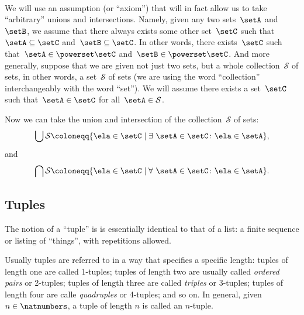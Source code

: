 



\


We will use an assumption (or ``axiom'') that will in fact allow us to take ``arbitrary'' unions and intersections.
Namely, given any two sets~$\setA$ and~$\setB$, we assume that there always exists some other set~$\setC$ such that~$\setA \subseteq \setC$ and~$\setB \subseteq \setC$.
In other words, there exists~$\setC$ such that~$\setA \in \powerset \setC$ and~$\setB \in \powerset \setC$.
And more generally, suppose that we are given not just two sets, but a whole collection~$\mathcal{S}$ of sets, in other words, a set~$\mathcal{S}$ of sets (we are using the word ``collection'' interchangeably with the word ``set'').
We will assume there exists a set~$\setC$ such that~$\setA \in \setC$ for all~$\setA \in \mathcal{S}$.



Now we can take the union and intersection of the collection~$\mathcal{S}$ of sets:
%
\begin{equation*}
    \bigcup \mathcal{S} \coloneqq \{ \ela \in \setC \mid \exists \  \setA \in \setC \colon \ela \in \setA \},
\end{equation*}
%
and
%
\begin{equation*}
    \bigcap \mathcal{S} \coloneqq \{ \ela \in \setC \mid \forall \  \setA \in \setC \colon \ela \in \setA \}.
\end{equation*}


\subsection{Tuples}

The notion of a ``tuple'' is is essentially identical to that of a list: a finite sequence or listing of ``things'', with repetitions allowed. 

Usually tuples are referred to in a way that specifies a specific length: tuples of length one are called 1-tuples; tuples of length two are usually called \emph{ordered pairs} or 2-tuples; tuples of length three are called \emph{triples} or $3$-tuples; tuples of length four are calle \emph{quadruples} or 4-tuples; and so on. In general, given $n \in \natnumbers$, a tuple of length $n$ is called an $n$-tuple. 

